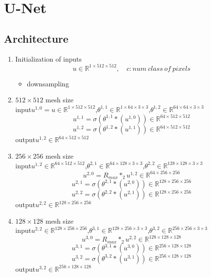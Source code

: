 \newpage
\section{U-Net}
\subsection{Architecture}
\begin{enumerate}
	\item Initialization of inputs
	$$u \in \mathbb{R}^{1\times 512\times 512},\quad c:num~class~of~pixels$$
	\begin{itemize}
		\item downsampling
	\end{itemize}
	\item $512\times 512$ mesh size\\
	input\quad $u^{1,0}=u\in \mathbb{R}^{1\times 512\times 512}$,\quad $\theta^{1,1} \in \mathbb{R}^{1\times 64\times 3\times 3}$,\quad $\theta^{1,2} \in \mathbb{R}^{64\times 64\times 3\times 3}$
	$$u^{1,1}=\sigma (\theta^{1,1} \ast (u^{1,0}))\in \mathbb{R}^{64\times 512\times 512}$$
	$$u^{1,2}=\sigma (\theta^{1,2} \ast (u^{1,1}))\in \mathbb{R}^{64\times 512\times 512}$$
	output\quad $u^{1,2} \in \mathbb{R}^{64\times 512\times 512}$
	
	\item $256\times 256$ mesh size\\
	input\quad $u^{1,2}\in \mathbb{R}^{64\times 512\times 512}$,\quad $\theta^{2,1} \in \mathbb{R}^{64\times 128\times 3\times 3}$,\quad $\theta^{2,2} \in \mathbb{R}^{128\times 128\times 3\times 3}$
	$$u^{2,0}=R_{max}*_{2}u^{1,2} \in \mathbb{R}^{64\times 256\times 256} $$
	$$u^{2,1}=\sigma (\theta^{2,1} \ast (u^{2,0}))\in \mathbb{R}^{128\times 256\times 256}$$
	$$u^{2,2}=\sigma (\theta^{2,2} \ast (u^{2,1}))\in \mathbb{R}^{128\times 256\times 256}$$
	output\quad $u^{2,2} \in \mathbb{R}^{128\times 256\times 256}$
	
	\item $128\times 128$ mesh size\\
	input\quad $u^{2,2}\in \mathbb{R}^{128\times 256\times 256}$,\quad $\theta^{3,1} \in \mathbb{R}^{128\times 256\times 3\times 3}$,\quad $\theta^{3,2} \in \mathbb{R}^{256\times 256\times 3\times 3}$
	$$u^{3,0}=R_{max}*_{2}u^{2,2} \in \mathbb{R}^{128\times 128\times 128} $$
	$$u^{3,1}=\sigma (\theta^{3,1} \ast (u^{3,0}))\in \mathbb{R}^{256\times 128\times 128}$$
	$$u^{3,2}=\sigma (\theta^{3,2} \ast (u^{3,1}))\in \mathbb{R}^{256\times 128\times 128}$$
	output\quad $u^{3,2} \in \mathbb{R}^{256\times 128\times 128}$
	

\end{enumerate}
